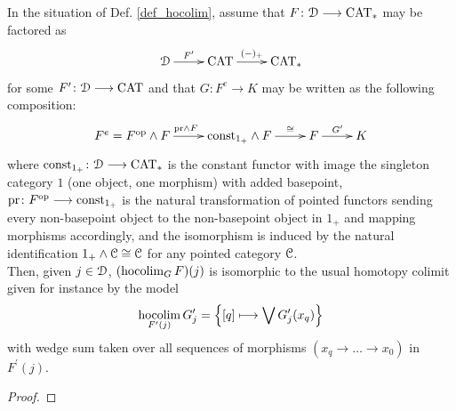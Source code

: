     \begin{lem}\label{lem_hocolim_name_justification}
      In the situation of Def. \ref{def_hocolim}, assume that $F \colon \mathcal{D} \longrightarrow
      \mathrm{CAT}_*$ may be factored as
      \begin{displaymath}
        \xymatrix{
          \cD \ar[r]^-{F^\prime} &
          \CAT \ar[r]^-{(-)_+} &
          \CAT_*
        }
      \end{displaymath}
      for some $F^\prime \colon \mathcal{D} \longrightarrow \mathrm{CAT}$ and that $G \colon F^e \to K$ may
      be written as the following composition:
      \begin{displaymath}
        \xymatrix{
          F^e = F^{\op} \wedge F \ar[r]^{\mathrm{pr} \wedge F} &
          \mathrm{const}_{1_+} \wedge F \ar[r]^-{\cong} &
          F \ar[r]^{G^\prime} &
          K
        }
      \end{displaymath}
      where $\mathrm{const}_{1_+} \colon \mathcal{D} \longrightarrow \mathrm{CAT}_*$ is the constant functor with
      image the singleton category $1$ (one object, one morphism) with added
      basepoint, $\mathrm{pr} \colon F^{\mathrm{op}} \longrightarrow \mathrm{const}_{1_+}$ is the
      natural transformation of pointed functors sending every non-basepoint
      object to the non-basepoint object in $1_+$ and mapping morphisms
      accordingly, and the isomorphism is induced by the natural identification
      $1_+ \wedge \mathcal{C} \cong \mathcal{C}$ for any pointed category $\mathcal{C}$.\\
      Then, given $j \in \mathcal{D}$, $(\operatorname*{hocolim}_G F)(j)$ is isomorphic to the usual
      homotopy colimit given for instance by the model
      \begin{displaymath}
        \operatorname*{hocolim}_{F^\prime(j)} G_j^\prime = \left\{ 
          [q] \longmapsto \bigvee G_j^\prime(x_q)
        \right\}
      \end{displaymath}
      with wedge sum taken over all sequences of morphisms $(x_q \to \ldots \to
      x_0)$ in $F^\prime(j)$.
    \end{lem}
    \begin{proof}
    \end{proof}
